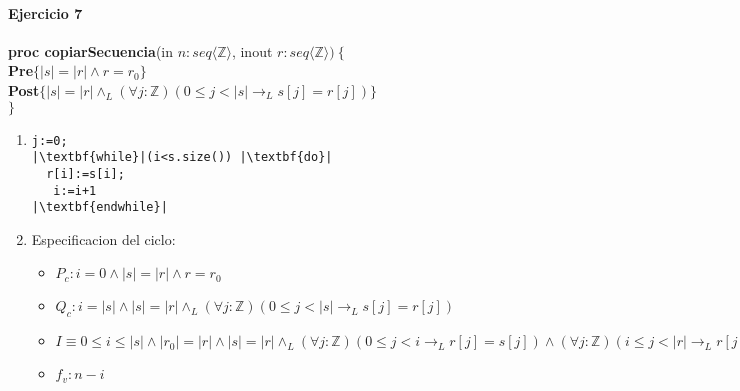 \documentclass{article}
\begin{document}
\paragraph{Ejercicio 7\\}
\noindent
\textbf{proc copiarSecuencia}(in $n: seq\langle\mathbb{Z}\rangle$, inout $r: seq\langle\mathbb{Z}\rangle)\ \{$\smallskip \\
\hspace*{6mm}\textbf{Pre}$\{|s|=|r|\wedge r=r_0\}$\\
\hspace*{6mm}\textbf{Post}$\{ |s|=|r|\wedge_L (\forall j:\mathbb{Z})(0\leq j<|s|\rightarrow_L s[j]=r[j])\}$\\
$\}$\medskip\\

\noindent
\begin{enumerate}[label=\alph*)]
	\item 

\begin{lstlisting}
j:=0;
|\textbf{while}|(i<s.size()) |\textbf{do}|
  r[i]:=s[i];
   i:=i+1
|\textbf{endwhile}|
\end{lstlisting}
	\item
	
 Especificacion del ciclo:
	\begin{itemize}
		\item $P_c: i=0 \wedge |s|=|r|\wedge r=r_0$
		\item $Q_c: i=|s|\wedge |s|=|r|\wedge_L (\forall j:\mathbb{Z})(0\leq j<|s|\rightarrow_L s[j]=r[j])$
		\item $I\equiv 0\leq i\leq |s|\wedge |r_0|=|r|\wedge |s|=|r|\wedge_L (\forall j:\mathbb{Z})(0\leq j<i \rightarrow_L r[j]=s[j])\wedge
		 (\forall j:\mathbb{Z})(i\leq j<|r|\rightarrow_L r[j]=r_0[j])$
		\item $f_v:n-i$
	\end{itemize}
	

\end{enumerate}
\end{document}
